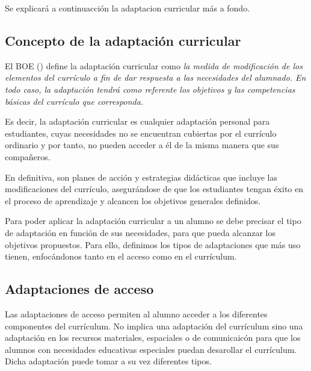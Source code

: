 Se explicará a continuacción la adaptacion curricular más a fondo.

\subsection{Concepto de la adaptación curricular}
El BOE (\citeyear{BOE}) define la adaptación curricular como \textit{la medida de modificación de los elementos del currículo a fin de dar respuesta a las necesidades del alumnado. En todo caso, la adaptación tendrá como referente los objetivos y las competencias básicas del currículo que corresponda.}

Es decir, la adaptación curricular es cualquier adaptación personal para estudiantes, cuyas necesidades no se encuentran cubiertas por el currículo ordinario y por tanto, no pueden acceder a él de la misma manera que sus compañeros.

En definitiva, son planes de acción y estrategias didácticas que incluye las modificaciones del currículo, asegurándose de que los estudiantes tengan éxito en el proceso de aprendizaje y alcancen los objetivos generales definidos.

Para poder aplicar la adaptación curricular a un alumno se debe precisar el tipo de adaptación en función de sus necesidades, para que pueda alcanzar los objetivos propuestos. Para ello, definimos los tipos de adaptaciones que más uso tienen, enfocándonos tanto en el acceso como en el currículum.

\subsection{Adaptaciones de acceso}
Las adaptaciones de acceso permiten al alumno acceder a los diferentes componentes del currículum. No implica una adaptación del currículum sino una adaptación en los recursos materiales, espaciales o de comunicaicón para que los alumnos con necesidades educativas especiales puedan desarollar el currículum.
Dicha adaptación puede tomar a su vez diferentes tipos.

